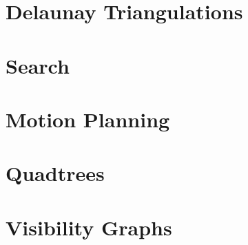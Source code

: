 	\chapter{Delaunay Triangulations}

	\chapter{Search}

	\chapter{Motion Planning}

	\chapter{Quadtrees}

	\chapter{Visibility Graphs}

